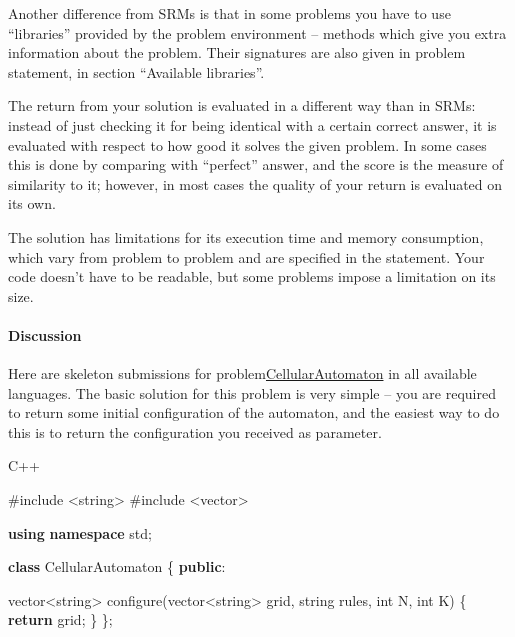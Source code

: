 \documentclass[]{article}
\newenvironment{Shaded}{}{}
\newcommand{\ControlFlowTok}[1]{\textcolor[rgb]{0.00,0.44,0.13}{\textbf{#1}}}
\newcommand{\DataTypeTok}[1]{\textcolor[rgb]{0.56,0.13,0.00}{#1}}
\newcommand{\ImportTok}[1]{#1}
\newcommand{\KeywordTok}[1]{\textcolor[rgb]{0.00,0.44,0.13}{\textbf{#1}}}
\newcommand{\NormalTok}[1]{#1}
\newcommand{\PreprocessorTok}[1]{\textcolor[rgb]{0.74,0.48,0.00}{#1}}
\let\oldparagraph\paragraph
\renewcommand{\paragraph}[1]{\oldparagraph{#1}\mbox{}}
\begin{document}
Another difference from SRMs is that in some problems you have to use
``libraries'' provided by the problem environment -- methods which give
you extra information about the problem. Their signatures are also given
in problem statement, in section ``Available libraries''.

The return from your solution is evaluated in a different way than in
SRMs: instead of just checking it for being identical with a certain
correct answer, it is evaluated with respect to how good it solves the
given problem. In some cases this is done by comparing with ``perfect''
answer, and the score is the measure of similarity to it; however, in
most cases the quality of your return is evaluated on its own.

The solution has limitations for its execution time and memory
consumption, which vary from problem to problem and are specified in the
statement. Your code doesn't have to be readable, but some problems
impose a limitation on its size.

\hypertarget{discussion-2}{%
\paragraph{Discussion}\label{discussion-2}}

Here are skeleton submissions for
problem\href{http://community.topcoder.com/longcontest/?module=ViewProblemStatement\&rd=14273\&pm=10989}{CellularAutomaton}
in all available languages. The basic solution for this problem is very
simple -- you are required to return some initial configuration of the
automaton, and the easiest way to do this is to return the configuration
you received as parameter.

C++

\begin{Shaded}
\begin{Highlighting}[]

\PreprocessorTok{#include }\ImportTok{<string>}
\PreprocessorTok{#include }\ImportTok{<vector>}

\KeywordTok{using} \KeywordTok{namespace}\NormalTok{ std;}

\KeywordTok{class}\NormalTok{ CellularAutomaton \{}
\KeywordTok{public}\NormalTok{:}

\NormalTok{   vector<string> configure(vector<string> grid, string rules, }\DataTypeTok{int}\NormalTok{ N, }\DataTypeTok{int}\NormalTok{ K) \{}
       \ControlFlowTok{return}\NormalTok{ grid;}
\NormalTok{   \}}
\NormalTok{\};}
\end{Highlighting}
\end{Shaded}
\end{document}
